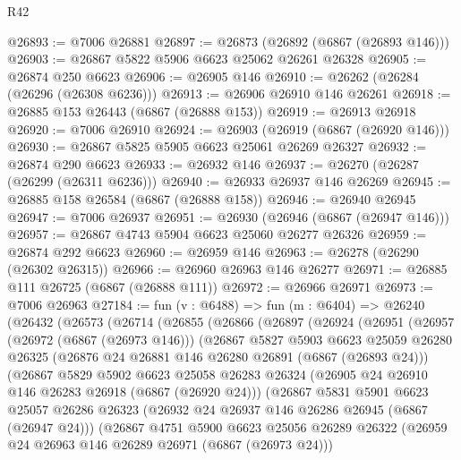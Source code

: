 \begin{lexlean}{R42}
\begin{coremodule}
{@26893 := @7006 @26881
@26897 := @26873 (@26892 (@6867 (@26893 @146)))
@26903 := @26867 @5822 @5906 @6623 @25062 @26261 @26328
@26905 := @26874 @250 @6623
@26906 := @26905 @146
@26910 := @26262 (@26284 (@26296 (@26308 @6236)))
@26913 := @26906 @26910 @146 @26261
@26918 := @26885 @153 @26443 (@6867 (@26888 @153))
@26919 := @26913 @26918
@26920 := @7006 @26910
@26924 := @26903 (@26919 (@6867 (@26920 @146)))
@26930 := @26867 @5825 @5905 @6623 @25061 @26269 @26327
@26932 := @26874 @290 @6623
@26933 := @26932 @146
@26937 := @26270 (@26287 (@26299 (@26311 @6236)))
@26940 := @26933 @26937 @146 @26269
@26945 := @26885 @158 @26584 (@6867 (@26888 @158))
@26946 := @26940 @26945
@26947 := @7006 @26937
@26951 := @26930 (@26946 (@6867 (@26947 @146)))
@26957 := @26867 @4743 @5904 @6623 @25060 @26277 @26326
@26959 := @26874 @292 @6623
@26960 := @26959 @146
@26963 := @26278 (@26290 (@26302 @26315))
@26966 := @26960 @26963 @146 @26277
@26971 := @26885 @111 @26725 (@6867 (@26888 @111))
@26972 := @26966 @26971
@26973 := @7006 @26963
@27184 := fun (v : @6488) =>
  fun (m : @6404) =>
  @26240
    (@26432
      (@26573
        (@26714
          (@26855
            (@26866
              (@26897
                (@26924
                  (@26951
                    (@26957
                      (@26972 (@6867 (@26973 @146)))
                      (@26867
                        @5827
                        @5903
                        @6623
                        @25059
                        @26280
                        @26325
                        (@26876 @24 @26881 @146 @26280 @26891 (@6867 (@26893 @24)))
                        (@26867
                          @5829
                          @5902
                          @6623
                          @25058
                          @26283
                          @26324
                          (@26905 @24 @26910 @146 @26283 @26918 (@6867 (@26920 @24)))
                          (@26867
                            @5831
                            @5901
                            @6623
                            @25057
                            @26286
                            @26323
                            (@26932 @24 @26937 @146 @26286 @26945 (@6867 (@26947 @24)))
                            (@26867
                              @4751
                              @5900
                              @6623
                              @25056
                              @26289
                              @26322
                              (@26959 @24 @26963 @146 @26289 @26971 (@6867 (@26973 @24)))
}
\end{coremodule}
\end{lexlean}
